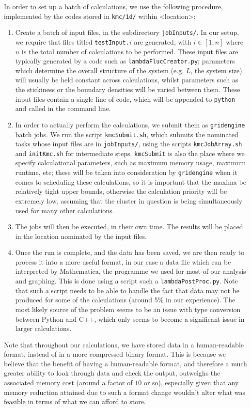 In order to set up a batch of calculations, we use the following procedure, implemented by the codes
stored in \texttt{kmc/1d/} within <location>:
\begin{enumerate}
 \item Create a batch of input files, in the subdirectory \texttt{jobInputs/}. In our setup, we
 require that files titled
 \texttt{testInput.}$i$ are generated, with $i \in [1, n]$ where $n$ is the total number of 
 calculations to be performed. These input files are typically generated by a code such as 
 \texttt{lambdaFlucCreator.py}; parameters which determine the overall structure
 of the system (e.g. $L$, the system size) will usually be held constant across calculations, whilst
 parameters such as the stickiness or the boundary densities will be varied between them. These input files contain a single line of code, which will be appended to \texttt{python } and called in the command line.
 \item In order to actually perform the calculations, we submit them as \texttt{gridengine} batch
 jobs. We  run the script \texttt{kmcSubmit.sh}, which submits the nominated tasks whose input
 files are in \texttt{jobInputs/}, using the scripts \texttt{kmcJobArray.sh} and 
 \texttt{initKmc.sh} for intermediate steps. \texttt{kmcSubmit} is also the place where we specify
 calculational parameters, such as maximum memory usage, maximum runtime, etc; these will be taken
 into consideration by \texttt{gridengine} when it comes to scheduling these calculations, so it
 is important that the maxima be relatively tight upper bounds, otherwise the calculation priority
 will be extremely low, assuming that the cluster in question is being simultaneously used for many other
 calculations.
 \item The jobs will then be executed, in their own time. The results will be placed in the location
 nominated by the input files.
 \item Once the run is complete, and the data has been saved, we are then ready to process it into a
 more useful format, in our case a data file which can be interpreted by Mathematica, the programme
 we used for most of our analysis and graphing. This is done using a script such a 
 \texttt{lambdaPostProc.py}. Note that such
 a script needs to be able to handle the fact that data may not be produced for some of the 
 calculations (around 5\% in our experience). The most likely source of the
 problem seems to be an issue with type conversion between Python and C++, which only seems to 
 become a significant issue in larger calculations.
\end{enumerate}
Note that throughout our calculations, we have stored data in a human-readable format, instead of
in a more compressed binary format. This is because we believe that the benefit of having a 
human-readable format, and therefore a much greater ability to look through data and check the 
output, outweighs the associated memory cost (around a factor of $10$ or so), 
especially given that any memory reduction attained due to such a format change wouldn't alter
what was feasible in terms of what we can afford to store.


